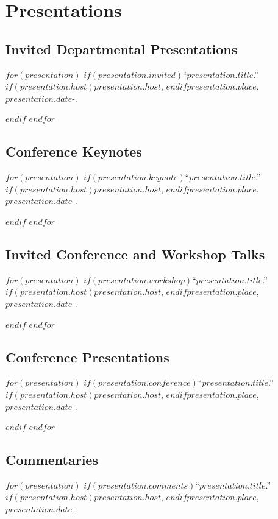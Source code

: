 \documentclass[11pt]{article}
\def\printdate#1{\xprintdate#1-}
\def\xprintdate#1-#2-#3-{#1}
\begin{document}
\section{Presentations}

\subsection{Invited Departmental Presentations}

$for(presentation)$
$if(presentation.invited)$\ind ``$presentation.title$.'' $if(presentation.host)$$presentation.host$, $endif$$presentation.place$, \printdate{$presentation.date$}.

$endif$
$endfor$

\subsection{Conference Keynotes}

$for(presentation)$
$if(presentation.keynote)$\ind ``$presentation.title$.'' $if(presentation.host)$\emph{$presentation.host$}, $endif$$presentation.place$, \printdate{$presentation.date$}.

$endif$
$endfor$

\subsection{Invited Conference and Workshop Talks}

$for(presentation)$
$if(presentation.workshop)$\ind ``$presentation.title$.'' $if(presentation.host)$\emph{$presentation.host$}, $endif$$presentation.place$, \printdate{$presentation.date$}.

$endif$
$endfor$

\subsection{Conference Presentations}

$for(presentation)$
$if(presentation.conference)$\ind ``$presentation.title$.'' $if(presentation.host)$\emph{$presentation.host$}, $endif$$presentation.place$, \printdate{$presentation.date$}.

$endif$
$endfor$

\subsection{Commentaries}

$for(presentation)$
$if(presentation.comments)$\ind ``$presentation.title$.'' $if(presentation.host)$\emph{$presentation.host$}, $endif$$presentation.place$, \printdate{$presentation.date$}.
\end{document}

